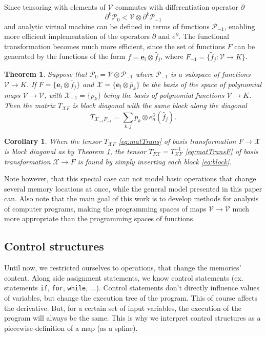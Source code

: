 \documentclass[preprint,12pt]{elsarticle}
\newcommand{\VV}{\mathcal{V}}
\newcommand{\e}{\mathbf{e}}
\newcommand{\X}{\mathcal{X}}
\newcommand{\dP}{\mathcal{P}}
\newcommand{\D}{\partial}
\newtheorem{izrek}{Theorem}[section]
\newtheorem{corollary}{Corollary}[section]
\begin{document}
Since tensoring with elements of $\VV$ commutes with differentiation operator $\D$
\begin{equation}
  \label{eq:dP0_dP-1}
  \D^k\dP_0 < \VV\otimes \D^k\dP_{-1}
\end{equation}
and analytic virtual machine can be defined in terms of functions $\dP_{-1}$,
enabling more efficient implementation of the operators $\D$ and $e^\D$. The
functional transformation becomes much more efficient, since the set of
functions $F$ can be generated by the functions of the form  $f=\e_i\otimes
\tilde{f_j}$, where $F_{-1}=\{\tilde{f}_j:\VV\to K \}$.
\begin{izrek}\label{izr:blockDiagonal}
Suppose that $\dP_0=\VV\otimes \dP_{-1}$ where $\dP_{-1}$ is a subspace of functions $\VV\to K$. If $F=\{\e_i\otimes \tilde{f_j}\}$ and $\X=\{\e_l\otimes \tilde{p_k}\}$ be the basis of the space of polynomial maps $\VV\to\VV$, with $\X_{-1}=\{p_k\}$ being the basis
of polynomial functions $\VV\to K$. Then the matrix $T_{\X F}$ is block diagonal with the same block along the diagonal
\begin{equation}
  \label{eq:block}
  T_{\X_{-1}F_{-1}} = \sum\limits_{k,j} p_k\otimes e^{\D}_n(\tilde{f_j}).
\end{equation}
\end{izrek}
\begin{corollary}
When the tensor $T_{\X F}$ \eqref{eq:matTrans} of basis transformation $F\to\X$ is block diagonal as by Theorem \ref{izr:blockDiagonal}, the tensor $T_{F\X}=T_{\X F}^{-1}$ \eqref{eq:matTransF} of basis transformation $\X\to F$ is found by simply inverting each block \eqref{eq:block}.
\end{corollary}
Note however, that this special case can not model basic operations that
change several memory locations at once, while the general model presented in this paper can. Also note that the main goal of this
work is to develop methods for analysis of computer programs, making the programming
spaces of maps $\VV\to \VV$ much more appropriate than the programming spaces of
functions.
 \subsection{Control structures}\label{sec:control}
 
 Until now, we restricted ourselves to operations, that change the memories' content. Along side assignment statements, we know control statements (ex. statements \texttt{if},
  \texttt{for}, \texttt{while}, ...). Control statements don't directly
  influence values of variables, but change the execution tree of the program.
  This of course affects the derivative. But, for a certain set of input
  variables, the execution of the program will always be the same. This is why
  we interpret control structures as a piecewise-definition of a map (as a spline).
  
\end{document}
